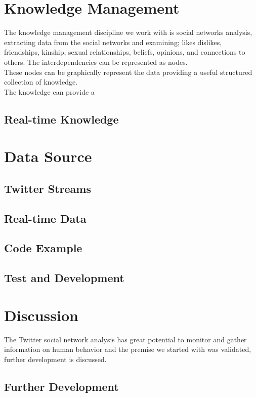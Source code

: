 \documentclass[]{article}  %
\begin{document}
\section{Knowledge Management}
The knowledge management discipline we work with is social networks analysis, extracting data from the social networks and examining; likes dislikes, friendships, kinship, sexual relationships, beliefs, opinions, and connections to others. The interdependencies can be represented as nodes. \\ These nodes can be graphically represent the data providing a useful structured collection of knowledge. \\  The knowledge can provide a 

\subsection{Real-time Knowledge}

\section{Data Source}
\subsection{Twitter Streams}
\subsection{Real-time Data}
\subsection{Code Example}
\subsection{Test and Development}
       
\section{Discussion}

The Twitter social network analysis has great potential to monitor and gather information on human behavior and the premise we started with was validated, further development is discussed. 

\subsection{Further Development}
\end{document}
